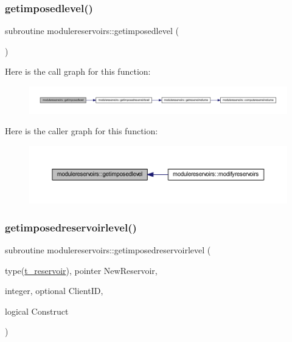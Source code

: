 \subsubsection{\texorpdfstring{getimposedlevel()}{getimposedlevel()}}
{\footnotesize\ttfamily subroutine modulereservoirs\+::getimposedlevel (\begin{DoxyParamCaption}{ }\end{DoxyParamCaption})\hspace{0.3cm}{\ttfamily [private]}}

Here is the call graph for this function\+:\nopagebreak
\begin{figure}[H]
\begin{center}
\leavevmode
\includegraphics[width=350pt]{namespacemodulereservoirs_a7e40106c12c54cc753164ac30f0fbf04_cgraph}
\end{center}
\end{figure}
Here is the caller graph for this function\+:\nopagebreak
\begin{figure}[H]
\begin{center}
\leavevmode
\includegraphics[width=350pt]{namespacemodulereservoirs_a7e40106c12c54cc753164ac30f0fbf04_icgraph}
\end{center}
\end{figure}
\mbox{\label{namespacemodulereservoirs_a22d1b1d83488cecbdcf52565d3aa4e99}} 
\subsubsection{\texorpdfstring{getimposedreservoirlevel()}{getimposedreservoirlevel()}}
{\footnotesize\ttfamily subroutine modulereservoirs\+::getimposedreservoirlevel (\begin{DoxyParamCaption}\item[{type(\mbox{\hyperlink{structmodulereservoirs_1_1t__reservoir}{t\+\_\+reservoir}}), pointer}]{New\+Reservoir,  }\item[{integer, optional}]{Client\+ID,  }\item[{logical}]{Construct }\end{DoxyParamCaption})\hspace{0.3cm}{\ttfamily [private]}}

